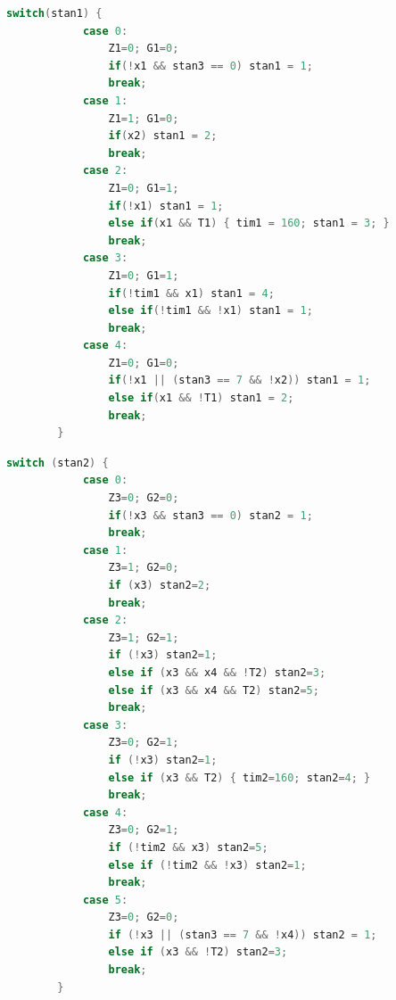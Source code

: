 \documentclass[12pt,oneside]{article}
\begin{document}
\begin{lstlisting}[language=C, caption={Logika zbiornika nr 1 - baza}, label={Kod:zb1}]
        switch(stan1) {
            case 0: 
                Z1=0; G1=0; 
                if(!x1 && stan3 == 0) stan1 = 1; 
                break;
            case 1: 
                Z1=1; G1=0; 
                if(x2) stan1 = 2; 
                break;
            case 2: 
                Z1=0; G1=1; 
                if(!x1) stan1 = 1; 
                else if(x1 && T1) { tim1 = 160; stan1 = 3; } 
                break;
            case 3: 
                Z1=0; G1=1; 
                if(!tim1 && x1) stan1 = 4; 
                else if(!tim1 && !x1) stan1 = 1; 
                break;
            case 4: 
                Z1=0; G1=0; 
                if(!x1 || (stan3 == 7 && !x2)) stan1 = 1; 
                else if(x1 && !T1) stan1 = 2; 
                break;
        }
\end{lstlisting}

\begin{lstlisting}[language=C, caption={Logika zbiornika nr 2 - utwardzacz}, label={Kod:zb2}]
        switch (stan2) {
            case 0: 
                Z3=0; G2=0; 
                if(!x3 && stan3 == 0) stan2 = 1; 
                break;
            case 1: 
                Z3=1; G2=0; 
                if (x3) stan2=2; 
                break;
            case 2: 
                Z3=1; G2=1; 
                if (!x3) stan2=1; 
                else if (x3 && x4 && !T2) stan2=3; 
                else if (x3 && x4 && T2) stan2=5; 
                break;
            case 3: 
                Z3=0; G2=1; 
                if (!x3) stan2=1; 
                else if (x3 && T2) { tim2=160; stan2=4; } 
                break;
            case 4: 
                Z3=0; G2=1; 
                if (!tim2 && x3) stan2=5; 
                else if (!tim2 && !x3) stan2=1; 
                break;
            case 5: 
                Z3=0; G2=0; 
                if (!x3 || (stan3 == 7 && !x4)) stan2 = 1; 
                else if (x3 && !T2) stan2=3; 
                break;
        }
\end{lstlisting}
\end{document}
